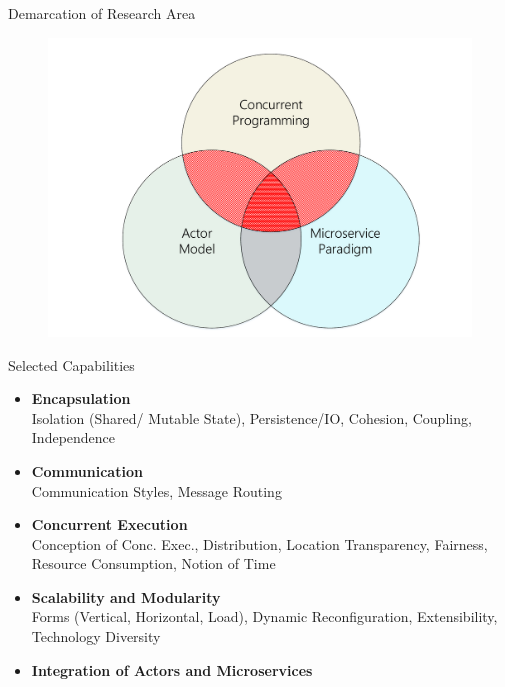 \documentclass{beamer}
\begin{document}

\begin{frame}{Demarcation of Research Area}

\pause

\begin{center}
  \begin{figure} 
    \includegraphics[width=\textwidth]{graphics/topics-venn.pdf} 
  \end{figure}
\end{center}

\end{frame}


\begin{frame}{Selected Capabilities}

\begin{itemize}
  \item \textbf{Encapsulation} \\%
        Isolation (Shared/ Mutable State), Persistence/IO, Cohesion, Coupling, Independence
  \item \textbf{Communication} \\%
        Communication Styles, Message Routing
  \item \textbf{Concurrent Execution} \\%
        Conception of Conc. Exec., Distribution, Location Transparency, Fairness, Resource Consumption, Notion of Time
  \item \textbf{Scalability and Modularity} \\%
        Forms (Vertical, Horizontal, Load), Dynamic Reconfiguration, Extensibility, Technology Diversity
  \item \textbf{Integration of Actors and Microservices}
\end{itemize}

\end{frame}
\end{document}
